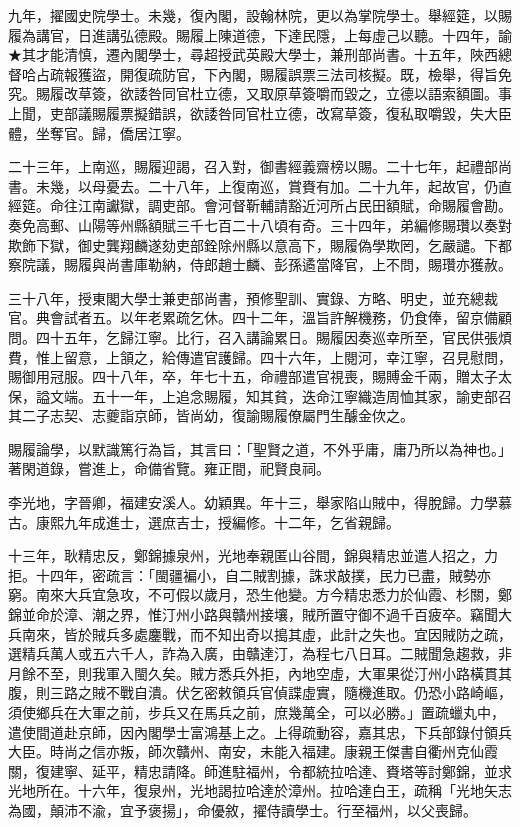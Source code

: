 \begin{pinyinscope}
九年，擢國史院學士。未幾，復內閣，設翰林院，更以為掌院學士。舉經筵，以賜履為講官，日進講弘德殿。賜履上陳道德，下達民隱，上每虛己以聽。十四年，諭★其才能清慎，遷內閣學士，尋超授武英殿大學士，兼刑部尚書。十五年，陜西總督哈占疏報獲盜，開復疏防官，下內閣，賜履誤票三法司核擬。既，檢舉，得旨免究。賜履改草簽，欲諉咎同官杜立德，又取原草簽嚼而毀之，立德以語索額圖。事上聞，吏部議賜履票擬錯誤，欲諉咎同官杜立德，改寫草簽，復私取嚼毀，失大臣體，坐奪官。歸，僑居江寧。

二十三年，上南巡，賜履迎謁，召入對，御書經義齋榜以賜。二十七年，起禮部尚書。未幾，以母憂去。二十八年，上復南巡，賞賚有加。二十九年，起故官，仍直經筵。命往江南讞獄，調吏部。會河督靳輔請豁近河所占民田額賦，命賜履會勘。奏免高郵、山陽等州縣額賦三千七百二十八頃有奇。三十四年，弟編修賜瓚以奏對欺飾下獄，御史龔翔麟遂劾吏部銓除州縣以意高下，賜履偽學欺罔，乞嚴譴。下都察院議，賜履與尚書庫勒納，侍郎趙士麟、彭孫遹當降官，上不問，賜瓚亦獲赦。

三十八年，授東閣大學士兼吏部尚書，預修聖訓、實錄、方略、明史，並充總裁官。典會試者五。以年老累疏乞休。四十二年，溫旨許解機務，仍食俸，留京備顧問。四十五年，乞歸江寧。比行，召入講論累日。賜履因奏巡幸所至，官民供張煩費，惟上留意，上頷之，給傳遣官護歸。四十六年，上閱河，幸江寧，召見慰問，賜御用冠服。四十八年，卒，年七十五，命禮部遣官視喪，賜賻金千兩，贈太子太保，謚文端。五十一年，上追念賜履，知其貧，迭命江寧織造周恤其家，諭吏部召其二子志契、志夔詣京師，皆尚幼，復諭賜履僚屬門生醵金佽之。

賜履論學，以默識篤行為旨，其言曰：「聖賢之道，不外乎庸，庸乃所以為神也。」著閑道錄，嘗進上，命備省覽。雍正間，祀賢良祠。

李光地，字晉卿，福建安溪人。幼穎異。年十三，舉家陷山賊中，得脫歸。力學慕古。康熙九年成進士，選庶吉士，授編修。十二年，乞省親歸。

十三年，耿精忠反，鄭錦據泉州，光地奉親匿山谷間，錦與精忠並遣人招之，力拒。十四年，密疏言：「閩疆褊小，自二賊割據，誅求敲撲，民力已盡，賊勢亦窮。南來大兵宜急攻，不可假以歲月，恐生他變。方今精忠悉力於仙霞、杉關，鄭錦並命於漳、潮之界，惟汀州小路與贛州接壤，賊所置守御不過千百疲卒。竊聞大兵南來，皆於賊兵多處鏖戰，而不知出奇以搗其虛，此計之失也。宜因賊防之疏，選精兵萬人或五六千人，詐為入廣，由贛達汀，為程七八日耳。二賊聞急趨救，非月餘不至，則我軍入閩久矣。賊方悉兵外拒，內地空虛，大軍果從汀州小路橫貫其腹，則三路之賊不戰自潰。伏乞密敕領兵官偵諜虛實，隨機進取。仍恐小路崎嶇，須使鄉兵在大軍之前，步兵又在馬兵之前，庶幾萬全，可以必勝。」置疏蠟丸中，遣使間道赴京師，因內閣學士富鴻基上之。上得疏動容，嘉其忠，下兵部錄付領兵大臣。時尚之信亦叛，師次贛州、南安，未能入福建。康親王傑書自衢州克仙霞關，復建寧、延平，精忠請降。師進駐福州，令都統拉哈達、賚塔等討鄭錦，並求光地所在。十六年，復泉州，光地謁拉哈達於漳州。拉哈達白王，疏稱「光地矢志為國，顛沛不渝，宜予褒揚」，命優敘，擢侍讀學士。行至福州，以父喪歸。


\end{pinyinscope}
